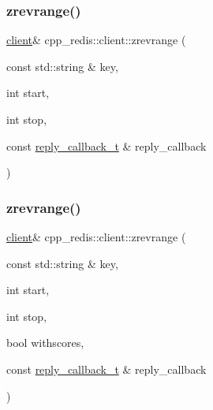 \subsubsection{\texorpdfstring{zrevrange()}{zrevrange()}\hspace{0.1cm}{\footnotesize\ttfamily [1/9]}}
{\footnotesize\ttfamily \hyperlink{classcpp__redis_1_1client}{client}\& cpp\+\_\+redis\+::client\+::zrevrange (\begin{DoxyParamCaption}\item[{const std\+::string \&}]{key,  }\item[{int}]{start,  }\item[{int}]{stop,  }\item[{const \hyperlink{classcpp__redis_1_1client_a061a1140d36d2eaeda82b09a0bb3f9f2}{reply\+\_\+callback\+\_\+t} \&}]{reply\+\_\+callback }\end{DoxyParamCaption})}

\mbox{\label{classcpp__redis_1_1client_a37bfbe4848350144e7899c6d1e63653b}} 
\subsubsection{\texorpdfstring{zrevrange()}{zrevrange()}\hspace{0.1cm}{\footnotesize\ttfamily [2/9]}}
{\footnotesize\ttfamily \hyperlink{classcpp__redis_1_1client}{client}\& cpp\+\_\+redis\+::client\+::zrevrange (\begin{DoxyParamCaption}\item[{const std\+::string \&}]{key,  }\item[{int}]{start,  }\item[{int}]{stop,  }\item[{bool}]{withscores,  }\item[{const \hyperlink{classcpp__redis_1_1client_a061a1140d36d2eaeda82b09a0bb3f9f2}{reply\+\_\+callback\+\_\+t} \&}]{reply\+\_\+callback }\end{DoxyParamCaption})}

\mbox{\label{classcpp__redis_1_1client_a001bdf0f597d386202b0aab116657055}} 

